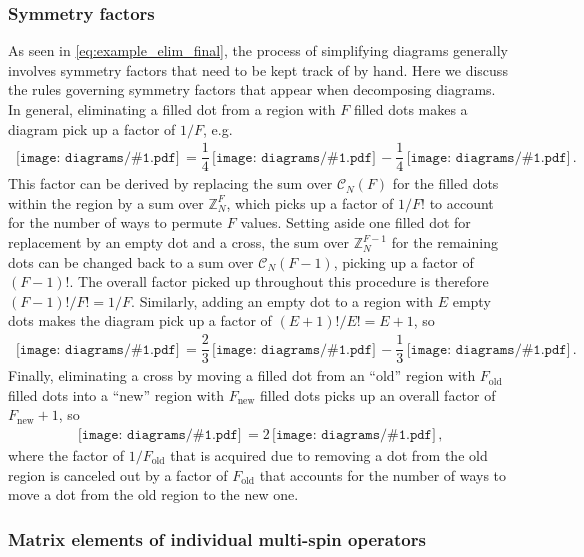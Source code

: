 \documentclass[nofootinbib,notitlepage,11pt]{revtex4-2}
\renewcommand{\t}{\text} %
\newcommand{\f}[2]{\dfrac{#1}{#2}} %
\newcommand{\p}[1]{\left(#1\right)} %
\newcommand{\1}{\mathds{1}}
\newcommand{\C}{\mathcal{C}}
\newcommand{\ZZ}{\mathbb{Z}}
\newcommand{\diagram}[1]
{\,\texttt{[image: diagrams/\#1.pdf]}\,}
\begin{document}
\subsubsection{Symmetry factors}
\label{sec:symmertry_factors}

As seen in \eqref{eq:example_elim_final}, the process of simplifying
diagrams generally involves symmetry factors that need to be kept
track of by hand.  Here we discuss the rules governing symmetry
factors that appear when decomposing diagrams.  In general,
eliminating a filled dot from a region with $F$ filled dots makes a
diagram pick up a factor of $1/F$, e.g.
\begin{align}
  \diagram{example_sym}
  = \f14 \diagram{example_sym_o}
  - \f14 \diagram{example_sym_x}.
\end{align}
This factor can be derived by replacing the sum over $\C_N\p{F}$ for
the filled dots within the region by a sum over $\ZZ_N^{F}$, which
picks up a factor of $1/F!$ to account for the number of ways to
permute $F$ values.  Setting aside one filled dot for replacement by
an empty dot and a cross, the sum over $\ZZ_N^{F-1}$ for the remaining
dots can be changed back to a sum over $\C_N\p{F-1}$, picking up a
factor of $\p{F-1}!$.  The overall factor picked up throughout this
procedure is therefore $\p{F-1}!/F!=1/F$.  Similarly, adding an empty
dot to a region with $E$ empty dots makes the diagram pick up a factor
of $\p{E+1}!/E!=E+1$, so
\begin{align}
  \diagram{example_sym_o}
  = \f23 \diagram{example_sym_oo}
  - \f13 \diagram{example_sym_ox}.
\end{align}
Finally, eliminating a cross by moving a filled dot from an ``old''
region with $F_{\t{old}}$ filled dots into a ``new'' region with
$F_{\t{new}}$ filled dots picks up an overall factor of
$F_{\t{new}}+1$, so
\begin{align}
  \diagram{example_sym_x}
  = 2 \diagram{example_sym_x_elim},
\end{align}
where the factor of $1/F_{\t{old}}$ that is acquired due to removing a
dot from the old region is canceled out by a factor of $F_{\t{old}}$
that accounts for the number of ways to move a dot from the old region
to the new one.

\subsubsection{Matrix elements of individual multi-spin operators}
\end{document}
